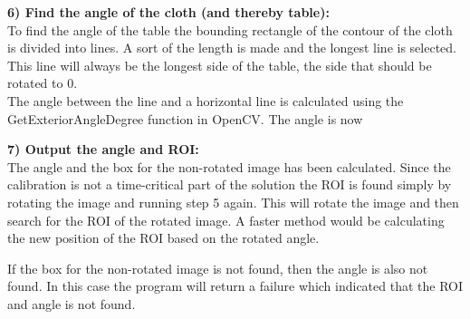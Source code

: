 \textbf{6) Find the angle of the cloth (and thereby table):}\\
To find the angle of the table the bounding rectangle of the contour of the cloth is divided into lines. A sort of the length is made and the longest line is selected. This line will always be the longest side of the table, the side that should be rotated to 0\degree. \\

The angle between the line and a horizontal line is calculated using the GetExteriorAngleDegree function in OpenCV\cite{opencv}. The angle is now 


\textbf{7) Output the angle and ROI:}\\
The angle and the box for the non-rotated image has been calculated. Since the calibration is not a time-critical part of the solution the ROI is found simply by rotating the image and running step 5 again.  This will rotate the image and then search for the ROI of the rotated image. A faster method would be calculating the new position of the ROI based on the rotated angle.

If the box for the non-rotated image is not found, then the angle is also not found. In this case the program will return a failure which indicated that the ROI and angle is not found. 